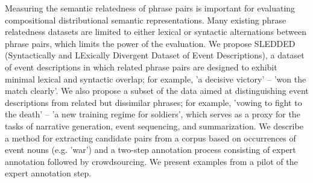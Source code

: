 Measuring the semantic relatedness of phrase pairs is important for evaluating compositional distributional semantic representations. Many existing phrase relatedness datasets are limited to either lexical or syntactic alternations between phrase pairs, which limits the power of the evaluation. We propose SLEDDED (Syntactically and LExically Divergent Dataset of Event Descriptions), a dataset of event descriptions in which related phrase pairs are designed to exhibit minimal lexical and syntactic overlap; for example, 'a decisive victory' -- 'won the match clearly'. We also propose a subset of the data aimed at distinguishing event descriptions from related but dissimilar phrases; for example, 'vowing to fight to the death' -- 'a new training regime for soldiers', which serves as a proxy for the tasks of narrative generation, event sequencing, and summarization. We describe a method for extracting candidate pairs from a corpus based on occurrences of event nouns (e.g. 'war') and a two-step annotation process consisting of expert annotation followed by crowdsourcing. We present examples from a pilot of the expert annotation step.

